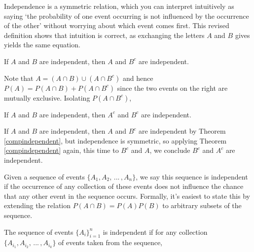 \rmk Independence is a symmetric relation, which you can interpret intuitively as saying `the probability of one event occurring is not influenced by the occurrence of the other' without worrying about which event comes first. This revised definition shows that intuition is correct, as exchanging the letters $A$ and $B$ gives yields the same equation.
\begin{thm}\label{compindependent}
If $A$ and $B$ are independent, then $A$ and $B^c$ are independent.
\end{thm}
\begin{pf}
Note that $A = (A \cap B) \cup (A \cap B^c)$ and hence $P(A) = P(A \cap B) + P(A \cap B^c)$ since the two events on the right are mutually exclusive. Isolating $P(A \cap B^c)$,
\end{pf}
\begin{cor}
If $A$ and $B$ are independent, then $A^c$ and $B^c$ are independent.
\end{cor}
\begin{pf}
If $A$ and $B$ are independent, then $A$ and $B^c$ are independent by Theorem \ref{compindependent}, but independence is symmetric, so applying Theorem \ref{compindependent} again, this time to $B^c$ and $A$, we conclude $B^c$ and $A^c$ are independent.
\end{pf}
\par
Given a sequence of events $\{A_1, A_2, \, ... \, , A_n\}$, we say this sequence is independent if the occurrence of any collection of these events does not influence the chance that any other event in the sequence occurs. Formally, it's easiest to state this by extending the relation $P(A \cap B) = P(A)P(B)$ to arbitrary subsets of the sequence.
\begin{defn}
The sequence of events $\{A_i\}_{i=1}^{n}$ is independent if for any collection $\{A_{i_1}, A_{i_2}, \, ... \, , A_{i_k}\}$ of events taken from the sequence,
\end{defn}
